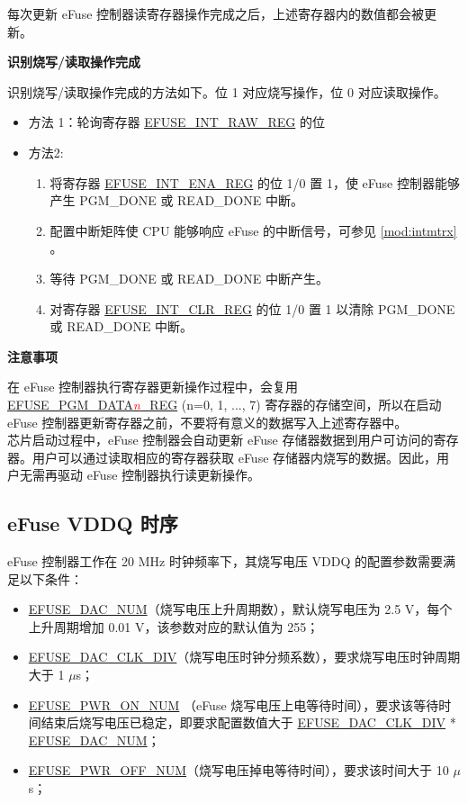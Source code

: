 \documentclass[main\_\_CN.tex]{subfiles}
\begin{document}
每次更新 eFuse 控制器读寄存器操作完成之后，上述寄存器内的数值都会被更新。

{\bfseries 识别烧写/读取操作完成}

识别烧写/读取操作完成的方法如下。位 1 对应烧写操作，位 0 对应读取操作。
\begin{itemize}

    \item 方法 1：轮询寄存器 \hyperref[regdesc:EFUSEINTRAWREG]{EFUSE\_INT\_RAW\_REG} 的位
    \item 方法2:
        \begin{enumerate}
            \item 将寄存器 \hyperref[regdesc:EFUSEINTENAREG]{EFUSE\_INT\_ENA\_REG} 的位 1/0 置 1，使 eFuse 控制器能够产生 PGM\_DONE 或 READ\_DONE 中断。
            \item 配置中断矩阵使 CPU 能够响应 eFuse 的中断信号，可参见 \ref{mod:intmtrx} \textit{}。

            \item 等待 PGM\_DONE 或 READ\_DONE 中断产生。

            \item 对寄存器 \hyperref[regdesc:EFUSEINTCLRREG]{EFUSE\_INT\_CLR\_REG} 的位 1/0 置 1 以清除 PGM\_DONE 或 READ\_DONE 中断。
    \end{enumerate}
\end{itemize}

{\bfseries 注意事项}

在 eFuse 控制器执行寄存器更新操作过程中，会复用 \hyperref[regdesc:EFUSEPGMDATA0REG]{EFUSE\_PGM\_DATA\textcolor{red}{\it{n}}\_REG} (n=0, 1, ..., 7) 寄存器的存储空间，所以在启动 eFuse 控制器更新寄存器之前，不要将有意义的数据写入上述寄存器中。\\
芯片启动过程中，eFuse 控制器会自动更新 eFuse 存储器数据到用户可访问的寄存器。用户可以通过读取相应的寄存器获取 eFuse 存储器内烧写的数据。因此，用户无需再驱动 eFuse 控制器执行读更新操作。

\subsection{eFuse VDDQ 时序}
\label{sec:efuse-vddq-timing}

eFuse 控制器工作在 20 MHz 时钟频率下，其烧写电压 VDDQ 的配置参数需要满足以下条件：
\begin{itemize}
    \item \hyperref[fielddesc:EFUSEDACNUM]{EFUSE\_DAC\_NUM}（烧写电压上升周期数），默认烧写电压为 2.5 V，每个上升周期增加 0.01 V，该参数对应的默认值为 255；
    \item \hyperref[fielddesc:EFUSEDACCLKDIV]{EFUSE\_DAC\_CLK\_DIV}（烧写电压时钟分频系数），要求烧写电压时钟周期大于 1 $\mu$s；
    \item \hyperref[fielddesc:EFUSEPWRONNUM]{EFUSE\_PWR\_ON\_NUM} （eFuse 烧写电压上电等待时间），要求该等待时间结束后烧写电压已稳定，即要求配置数值大于 \hyperref[fielddesc:EFUSEDACCLKDIV]{EFUSE\_DAC\_CLK\_DIV} * \hyperref[fielddesc:EFUSEDACNUM]{EFUSE\_DAC\_NUM}；
    \item \hyperref[fielddesc:EFUSEPWROFFNUM]{EFUSE\_PWR\_OFF\_NUM}（烧写电压掉电等待时间），要求该时间大于 10 $\mu$s；
\end{itemize}
\end{document}
